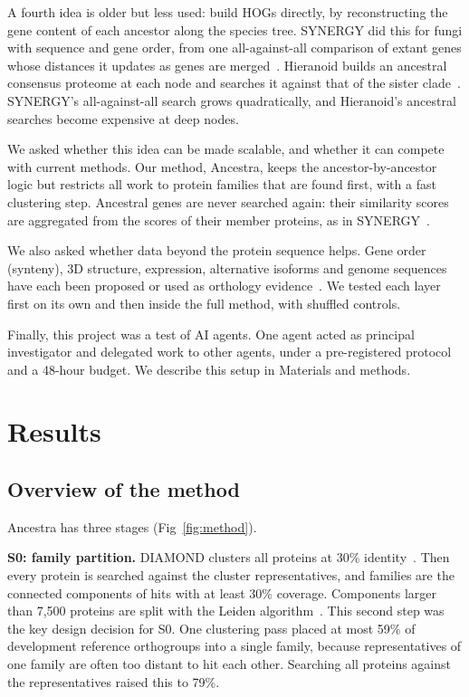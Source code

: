 \documentclass[10pt,letterpaper]{article}
\begin{document}
A fourth idea is older but less used: build HOGs directly, by reconstructing the gene content of each ancestor along the species tree. SYNERGY did this for fungi with sequence and gene order, from one all-against-all comparison of extant genes whose distances it updates as genes are merged~\cite{wapinski2007synergy}. Hieranoid builds an ancestral consensus proteome at each node and searches it against that of the sister clade~\cite{schreiber2013hieranoid,kaduk2017hieranoid2}. SYNERGY's all-against-all search grows quadratically, and Hieranoid's ancestral searches become expensive at deep nodes.

We asked whether this idea can be made scalable, and whether it can compete with current methods. Our method, Ancestra, keeps the ancestor-by-ancestor logic but restricts all work to protein families that are found first, with a fast clustering step. Ancestral genes are never searched again: their similarity scores are aggregated from the scores of their member proteins, as in SYNERGY~\cite{wapinski2007synergy}.

We also asked whether data beyond the protein sequence helps. Gene order (synteny), 3D structure, expression, alternative isoforms and genome sequences have each been proposed or used as orthology evidence~\cite{lechner2014poff,ludwig2024orthorefine,moi2025foldtree,bastian2025bgee,kirilenko2023toga}. We tested each layer first on its own and then inside the full method, with shuffled controls.

Finally, this project was a test of AI agents. One agent acted as principal investigator and delegated work to other agents, under a pre-registered protocol and a 48-hour budget. We describe this setup in Materials and methods.

\section*{Results}

\subsection*{Overview of the method}
Ancestra has three stages (Fig~\ref{fig:method}).

\textbf{S0: family partition.} DIAMOND clusters all proteins at 30\% identity~\cite{buchfink2021diamond,buchfink2026deepclust}. Then every protein is searched against the cluster representatives, and families are the connected components of hits with at least 30\% coverage. Components larger than 7,500 proteins are split with the Leiden algorithm~\cite{traag2019leiden}. This second step was the key design decision for S0. One clustering pass placed at most 59\% of development reference orthogroups into a single family, because representatives of one family are often too distant to hit each other. Searching all proteins against the representatives raised this to 79\%.
\end{document}
